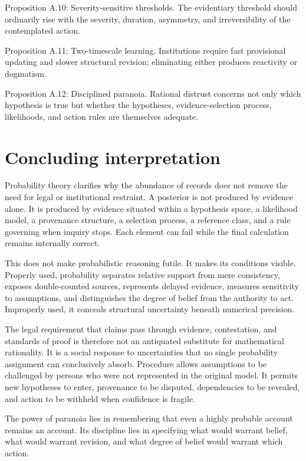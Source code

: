 Proposition A.10: Severity-sensitive thresholds. The evidentiary threshold should ordinarily rise with the severity, duration, asymmetry, and irreversibility of the contemplated action.

Proposition A.11: Two-timescale learning. Institutions require fast provisional updating and slower structural revision; eliminating either produces reactivity or dogmatism.

Proposition A.12: Disciplined paranoia. Rational distrust concerns not only which hypothesis is true but whether the hypotheses, evidence-selection process, likelihoods, and action rules are themselves adequate.

\section{Concluding interpretation}
\label{sec:a66}

Probability theory clarifies why the abundance of records does not remove the need for legal or institutional restraint. A posterior is not produced by evidence alone. It is produced by evidence situated within a hypothesis space, a likelihood model, a provenance structure, a selection process, a reference class, and a rule governing when inquiry stops. Each element can fail while the final calculation remains internally correct.

This does not make probabilistic reasoning futile. It makes its conditions visible. Properly used, probability separates relative support from mere consistency, exposes double-counted sources, represents delayed evidence, measures sensitivity to assumptions, and distinguishes the degree of belief from the authority to act. Improperly used, it conceals structural uncertainty beneath numerical precision.

The legal requirement that claims pass through evidence, contestation, and standards of proof is therefore not an antiquated substitute for mathematical rationality. It is a social response to uncertainties that no single probability assignment can conclusively absorb. Procedure allows assumptions to be challenged by persons who were not represented in the original model. It permits new hypotheses to enter, provenance to be disputed, dependencies to be revealed, and action to be withheld when confidence is fragile.

The power of paranoia lies in remembering that even a highly probable account remains an account. Its discipline lies in specifying what would warrant belief, what would warrant revision, and what degree of belief would warrant which action.
